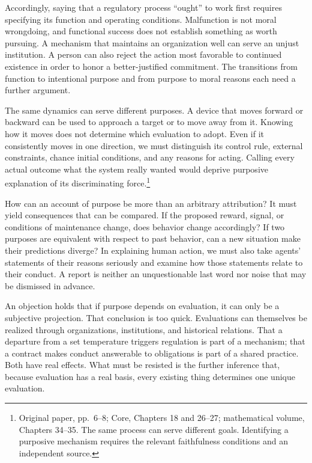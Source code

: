 \documentclass[
  english,
  11pt,
  oneside]{book}
\begin{document}
Accordingly, saying that a regulatory process ``ought'' to work first requires specifying its function and operating conditions. Malfunction is not moral wrongdoing, and functional success does not establish something as worth pursuing. A mechanism that maintains an organization well can serve an unjust institution. A person can also reject the action most favorable to continued existence in order to honor a better-justified commitment. The transitions from function to intentional purpose and from purpose to moral reasons each need a further argument.

The same dynamics can serve different purposes. A device that moves forward or backward can be used to approach a target or to move away from it. Knowing how it moves does not determine which evaluation to adopt. Even if it consistently moves in one direction, we must distinguish its control rule, external constraints, chance initial conditions, and any reasons for acting. Calling every actual outcome what the system really wanted would deprive purposive explanation of its discriminating force.\footnote{\hypertarget{ph-note-29}{}Original paper, pp.~6--8; Core, Chapters 18 and 26--27; mathematical volume, Chapters 34--35. The same process can serve different goals. Identifying a purposive mechanism requires the relevant faithfulness conditions and an independent source.}

How can an account of purpose be more than an arbitrary attribution? It must yield consequences that can be compared. If the proposed reward, signal, or conditions of maintenance change, does behavior change accordingly? If two purposes are equivalent with respect to past behavior, can a new situation make their predictions diverge? In explaining human action, we must also take agents' statements of their reasons seriously and examine how those statements relate to their conduct. A report is neither an unquestionable last word nor noise that may be dismissed in advance.

An objection holds that if purpose depends on evaluation, it can only be a subjective projection. That conclusion is too quick. Evaluations can themselves be realized through organizations, institutions, and historical relations. That a departure from a set temperature triggers regulation is part of a mechanism; that a contract makes conduct answerable to obligations is part of a shared practice. Both have real effects. What must be resisted is the further inference that, because evaluation has a real basis, every existing thing determines one unique evaluation.
\end{document}
